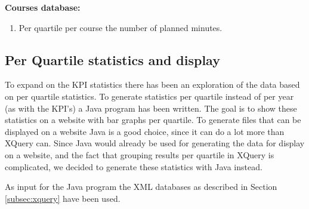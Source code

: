 \textbf{Courses database:}
\begin{enumerate}
	\item Per quartile per course the number of planned minutes.
\end{enumerate}

\subsection{Per Quartile statistics and display}
To expand on the KPI statistics there has been an exploration of the data based on per quartile statistics. To generate statistics per quartile instead of per year (as with the KPI's) a Java program has been written. The goal is to show these statistics on a website with bar graphs per quartile. To generate files that can be displayed on a website Java is a good choice, since it can do a lot more than XQuery can. Since Java would already be used for generating the data for display on a website, and the fact that grouping results per quartile in XQuery is complicated, we decided to generate these statistics with Java instead.

As input for the Java program the XML databases as described in Section \ref{subsec:xquery} have been used. 





